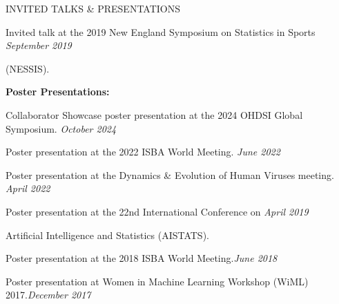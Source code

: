\documentclass{resume} %
\begin{document}
\begin{rSection}{INVITED TALKS \& PRESENTATIONS}
	
	{Invited talk at the 2019 New England Symposium on Statistics in Sports} \hfill {\em September 2019}
	
	\vspace{-0.1in}
	(NESSIS).
	
	
	
	
	
	\medskip
	
	\hspace*{-0.2in}\textbf{Poster Presentations:}
	
	Collaborator Showcase poster presentation at the 2024 OHDSI Global Symposium.  \hfill {\em October 2024}
	
	Poster presentation at the 2022 ISBA World Meeting. \hfill {\em June 2022}
	
	Poster presentation at the Dynamics \& Evolution of Human Viruses meeting.  \hfill {\em April 2022}
	
	
	Poster presentation at the 22nd International Conference on   \hfill {\em April 2019}
	
	\vspace{-0.1in}
	Artificial Intelligence and Statistics (AISTATS).
	
	
	
	Poster presentation at the 2018 ISBA World Meeting.\hfill {\em June 2018}
	
	Poster presentation at Women in Machine Learning Workshop (WiML) 2017.\hfill {\em December 2017}
	
\end{rSection}






\end{document}
